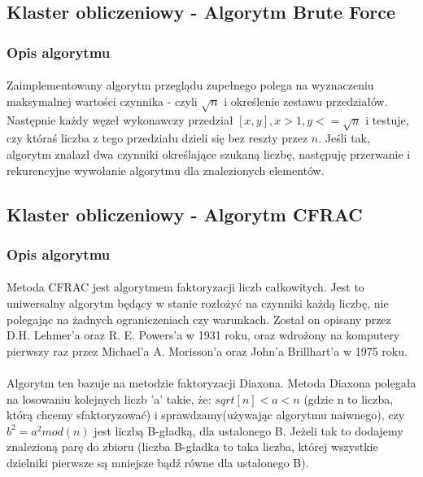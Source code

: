 \documentclass{article}
\begin{document}
\subsection{Klaster obliczeniowy - Algorytm Brute Force}
\subsubsection{Opis algorytmu}
\paragraph{}Zaimplementowany algorytm przeglądu zupełnego polega na wyznaczeniu maksymalnej wartości czynnika - czyli $\sqrt{n}$ i określenie zestawu przedziałów. Następnie każdy węzeł wykonawczy przedział $[x,y], x > 1, y <= \sqrt{n}$ i testuje, czy któraś liczba z tego przedziału dzieli się bez reszty przez $n$. Jeśli tak, algorytm znalazł dwa czynniki określające szukaną liczbę, następuję przerwanie i rekurencyjne wywołanie algorytmu dla znalezionych elementów.


\subsection{Klaster obliczeniowy - Algorytm CFRAC}
\subsubsection{Opis algorytmu\cite{cfracwiki}\cite{cfracinz}}
\paragraph{}Metoda CFRAC  jest algorytmem faktoryzacji liczb całkowitych. Jest to uniwersalny algorytm będący w stanie rozłożyć na czynniki każdą liczbę, nie polegając na żadnych ograniczeniach czy warunkach. Został on opisany przez D.H. Lehmer'a oraz R. E. Powers'a w 1931 roku, oraz wdrożony na komputery pierwszy raz przez Michael'a A. Morisson'a oraz John'a Brillhart'a w 1975 roku.

\paragraph{}Algorytm ten bazuje na metodzie faktoryzacji Diaxona. Metoda Diaxona polegała na losowaniu kolejnych liczb 'a' takie, że:
$sqrt[n] < a < n$ (gdzie n to liczba, którą chcemy sfaktoryzować)
i sprawdzamy(używając algorytmu naiwnego), czy $b^2 = a^2mod(n)$ jest liczbą B-gładką, dla ustalonego B. Jeżeli tak to dodajemy znalezioną parę do zbioru (liczba B-gładka to taka liczba, której wszystkie dzielniki pierwsze są mniejsze bądź równe dla ustalonego B).
\end{document}

